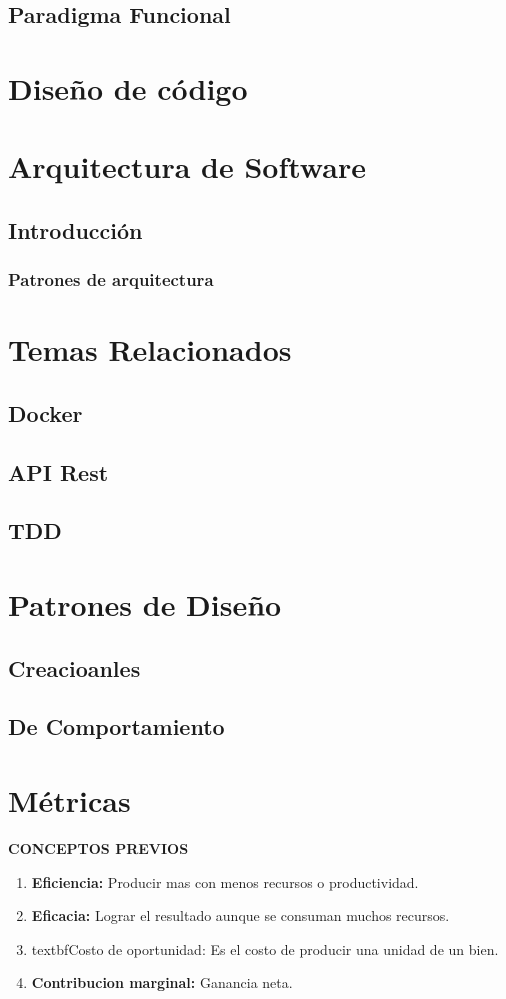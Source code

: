 \documentclass[12pt]{book}
\begin{document}
\section{Paradigma Funcional}


\chapter{Diseño de código}

\chapter{Arquitectura de Software}
\section{Introducción}
\subsection{Patrones de arquitectura}

\chapter{Temas Relacionados}
\section{Docker}
\section{API Rest}
\section{TDD}

\chapter{Patrones de Diseño}
\section{Creacioanles}
\section{De Comportamiento}

\chapter{Métricas}
\textbf{CONCEPTOS PREVIOS}
\begin{enumerate}
	\item \textbf{Eficiencia:} Producir mas con menos recursos o productividad.
	\item \textbf{Eficacia:} Lograr el resultado aunque se consuman muchos recursos.
	\item textbf{Costo de oportunidad:} Es el costo de producir una unidad de un bien.
	\item \textbf{Contribucion marginal:} Ganancia neta.
\end{enumerate}
\end{document}
